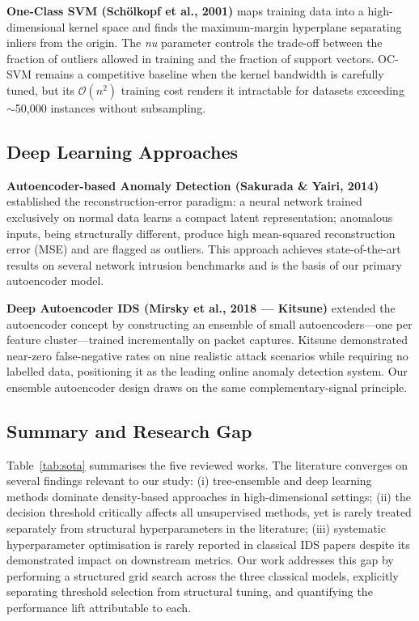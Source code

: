 \textbf{One-Class SVM (Schölkopf et al., 2001)} \cite{scholkopf2001ocsvm} maps training data into a high-dimensional kernel space and finds the maximum-margin hyperplane separating inliers from the origin. The \textit{nu} parameter controls the trade-off between the fraction of outliers allowed in training and the fraction of support vectors. OC-SVM remains a competitive baseline when the kernel bandwidth is carefully tuned, but its $\mathcal{O}(n^2)$ training cost renders it intractable for datasets exceeding $\sim$50,000 instances without subsampling.

\subsection{Deep Learning Approaches}

\textbf{Autoencoder-based Anomaly Detection (Sakurada \& Yairi, 2014)} \cite{sakurada2014autoencoder} established the reconstruction-error paradigm: a neural network trained exclusively on normal data learns a compact latent representation; anomalous inputs, being structurally different, produce high mean-squared reconstruction error (MSE) and are flagged as outliers. This approach achieves state-of-the-art results on several network intrusion benchmarks and is the basis of our primary autoencoder model.   

\textbf{Deep Autoencoder IDS (Mirsky et al., 2018 — Kitsune)} \cite{mirsky2018kitsune} extended the autoencoder concept by constructing an ensemble of small autoencoders—one per feature cluster—trained incrementally on packet captures. Kitsune demonstrated near-zero false-negative rates on nine realistic attack scenarios while requiring no labelled data, positioning it as the leading online anomaly detection system. Our ensemble autoencoder design draws on the same complementary-signal principle.

\subsection{Summary and Research Gap}

Table~\ref{tab:sota} summarises the five reviewed works. The literature converges on several findings relevant to our study: (i) tree-ensemble and deep learning methods dominate density-based approaches in high-dimensional settings; (ii) the decision threshold critically affects all unsupervised methods, yet is rarely treated separately from structural hyperparameters in the literature; (iii) systematic hyperparameter optimisation is rarely reported in classical IDS papers despite its demonstrated impact on downstream metrics. Our work addresses this gap by performing a structured grid search across the three classical models, explicitly separating threshold selection from structural tuning, and quantifying the performance lift attributable to each.


